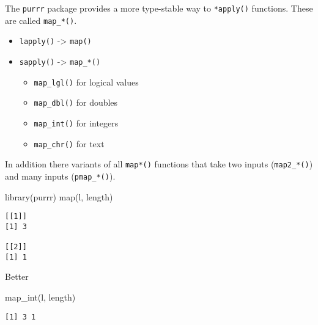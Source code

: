 \documentclass[ignorenonframetext,,t]{beamer}
\providecommand{\tightlist}{%
\setlength{\itemsep}{0pt}\setlength{\parskip}{0pt}}
\newenvironment{Shaded}{\begin{snugshade}}{\end{snugshade}}
\newcommand{\FunctionTok}[1]{\textcolor[rgb]{0.00,0.00,0.00}{#1}}
\newcommand{\NormalTok}[1]{#1}
\providecommand{\tightlist}{%
\setlength{\itemsep}{0pt}\setlength{\parskip}{0pt}}
\renewcommand{\tightlist}{\setlength{\itemsep}{1.4ex}\setlength{\parskip}{0pt}}
\begin{document}
\begin{frame}[fragile]
The \texttt{purrr} package provides a more type-stable way to
\texttt{*apply()} functions. These are called \texttt{map\_*()}.

\begin{itemize}
\tightlist
\item
  \texttt{lapply()} -\textgreater{} \texttt{map()}
\item
  \texttt{sapply()} -\textgreater{} \texttt{map\_*()}

  \begin{itemize}
  \tightlist
  \item
    \texttt{map\_lgl()} for logical values
  \item
    \texttt{map\_dbl()} for doubles
  \item
    \texttt{map\_int()} for integers
  \item
    \texttt{map\_chr()} for text
  \end{itemize}
\end{itemize}

In addition there variants of all \texttt{map*()} functions that take
two inputs (\texttt{map2\_*()}) and many inputs (\texttt{pmap\_*()}).
\end{frame}

\begin{frame}[fragile]
\begin{Shaded}
\begin{Highlighting}[]
\FunctionTok{library}\NormalTok{(purrr)}
\FunctionTok{map}\NormalTok{(l, length)}
\end{Highlighting}
\end{Shaded}

\begin{verbatim}
[[1]]
[1] 3

[[2]]
[1] 1
\end{verbatim}

Better

\begin{Shaded}
\begin{Highlighting}[]
\FunctionTok{map\_int}\NormalTok{(l, length)}
\end{Highlighting}
\end{Shaded}

\begin{verbatim}
[1] 3 1
\end{verbatim}
\end{frame}
\end{document}
